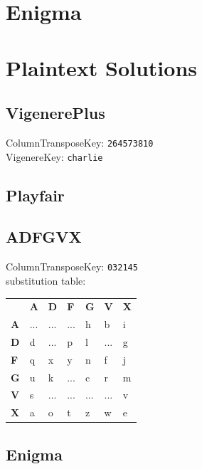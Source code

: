 \documentclass{article}
\begin{document}
\section{Enigma}
\section{Plaintext Solutions}
\subsection{VigenerePlus}
ColumnTransposeKey: \texttt{264573810}\\
VigenereKey: \texttt{charlie}\\
\subsection{Playfair}
\subsection{ADFGVX}
ColumnTransposeKey: \texttt{032145}\\
substitution table:
\\
\begin{table}[H]
\begin{tabular}{lllllll}
\textbf{} &
  \textbf{A} &
  \textbf{D} &
  \textbf{F} &
  \textbf{G} &
  \textbf{V} &
  \textbf{X} \\ \cline{2-7}
\multicolumn{1}{l|}{\textbf{A}} &
  \multicolumn{1}{l|}{...} &
  \multicolumn{1}{l|}{...} &
  \multicolumn{1}{l|}{...} &
  \multicolumn{1}{l|}{h} &
  \multicolumn{1}{l|}{b} &
  \multicolumn{1}{l|}{i} \\ \cline{2-7}
\multicolumn{1}{l|}{\textbf{D}} &
  \multicolumn{1}{l|}{d} &
  \multicolumn{1}{l|}{...} &
  \multicolumn{1}{l|}{p} &
  \multicolumn{1}{l|}{l} &
  \multicolumn{1}{l|}{...} &
  \multicolumn{1}{l|}{g} \\ \cline{2-7}
\multicolumn{1}{l|}{\textbf{F}} &
  \multicolumn{1}{l|}{q} &
  \multicolumn{1}{l|}{x} &
  \multicolumn{1}{l|}{y} &
  \multicolumn{1}{l|}{n} &
  \multicolumn{1}{l|}{f} &
  \multicolumn{1}{l|}{j} \\ \cline{2-7}
\multicolumn{1}{l|}{\textbf{G}} &
  \multicolumn{1}{l|}{u} &
  \multicolumn{1}{l|}{k} &
  \multicolumn{1}{l|}{...} &
  \multicolumn{1}{l|}{c} &
  \multicolumn{1}{l|}{r} &
  \multicolumn{1}{l|}{m} \\ \cline{2-7}
\multicolumn{1}{l|}{\textbf{V}} &
  \multicolumn{1}{l|}{s} &
  \multicolumn{1}{l|}{...} &
  \multicolumn{1}{l|}{...} &
  \multicolumn{1}{l|}{...} &
  \multicolumn{1}{l|}{...} &
  \multicolumn{1}{l|}{v} \\ \cline{2-7}
\multicolumn{1}{l|}{\textbf{X}} &
  \multicolumn{1}{l|}{a} &
  \multicolumn{1}{l|}{o} &
  \multicolumn{1}{l|}{t} &
  \multicolumn{1}{l|}{z} &
  \multicolumn{1}{l|}{w} &
  \multicolumn{1}{l|}{e} \\ \cline{2-7}
\end{tabular}
\end{table}
\subsection{Enigma}
\end{document}
